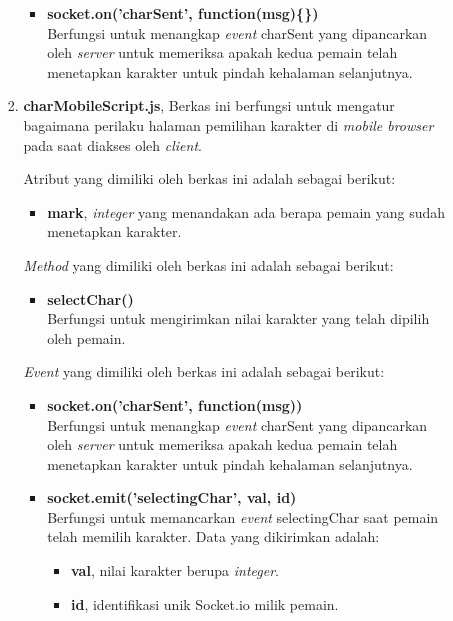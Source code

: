 \begin{enumerate}
\begin{enumerate}
\begin{enumerate}
\begin{itemize}
				\item \textbf{socket.on('charSent', function(msg)\{\})} \\
				Berfungsi untuk menangkap \textit{event} charSent yang dipancarkan oleh \textit{server} untuk memeriksa apakah kedua pemain telah menetapkan karakter untuk pindah kehalaman selanjutnya.
			\end{itemize}
			
			\item \textbf{charMobileScript.js}, Berkas ini berfungsi untuk mengatur bagaimana perilaku halaman pemilihan karakter di \textit{mobile browser} pada saat diakses oleh \textit{client}.
			
			Atribut yang dimiliki oleh berkas ini adalah sebagai berikut:
			\begin{itemize}
				\item \textbf{mark}, \textit{integer} yang menandakan ada berapa pemain yang sudah menetapkan karakter.
			\end{itemize}
		
			\textit{Method} yang dimiliki oleh berkas ini adalah sebagai berikut:
			\begin{itemize}
				\item \textbf{selectChar()} \\
				Berfungsi untuk mengirimkan nilai karakter yang telah dipilih oleh pemain.
			\end{itemize}
			
			\textit{Event} yang dimiliki oleh berkas ini adalah sebagai berikut:
			\begin{itemize}
				\item \textbf{socket.on('charSent', function(msg){})} \\ 
				Berfungsi untuk menangkap \textit{event} charSent yang dipancarkan oleh \textit{server} untuk memeriksa apakah kedua pemain telah menetapkan karakter untuk pindah kehalaman selanjutnya.
				
				\item \textbf{socket.emit('selectingChar', {val, id})} \\
				Berfungsi untuk memancarkan \textit{event} selectingChar saat pemain telah memilih karakter. Data yang dikirimkan adalah:
				\begin{itemize}
					\item \textbf{val}, nilai karakter berupa \textit{integer}.
					\item \textbf{id}, identifikasi unik Socket.io milik pemain.
				\end{itemize}
			

\end{itemize}
\end{enumerate}
\end{enumerate}
\end{enumerate}
